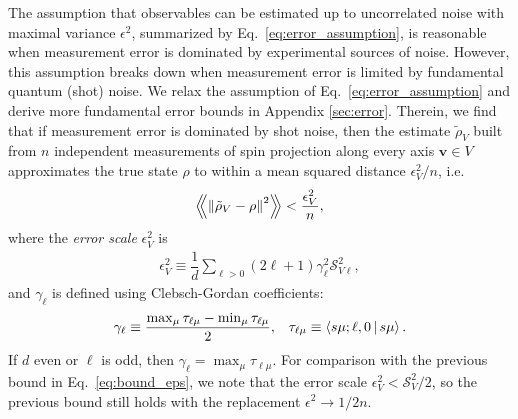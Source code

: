 \documentclass[notitlepage,twocolumn]{revtex4-2}
\newcommand{\f}[2]{\dfrac{#1}{#2}} %
\newcommand{\p}[1]{\left(#1\right)} %
\newcommand{\bk}{\Braket} %
\renewcommand{\v}{\bm} %
\newcommand{\Bbk}[1]
{\left\langle\!\!\left\langle #1 \right\rangle\!\!\right\rangle}
\renewcommand{\S}{\mathcal{S}}
\begin{document}
The assumption that observables can be estimated up to uncorrelated noise with maximal variance $\epsilon^2$, summarized by Eq.~\eqref{eq:error_assumption}, is reasonable when measurement error is dominated by experimental sources of noise.
However, this assumption breaks down when measurement error is limited by fundamental quantum (shot) noise.
We relax the assumption of Eq.~\eqref{eq:error_assumption} and derive more fundamental error bounds in Appendix \ref{sec:error}.
Therein, we find that if measurement error is dominated by shot noise, then the estimate $\tilde\rho_V$ built from $n$ independent measurements of spin projection along every axis $\v v\in V$ approximates the true state $\rho$ to within a mean squared distance $\epsilon_V^2/n$, i.e.
\begin{align}
  \Bbk{\norm{\tilde\rho_V-\rho}^2} < \f{\epsilon_V^2}{n},
  \label{eq:bound}
\end{align}
where the {\it error scale} $\epsilon_V^2$ is
\begin{align}
  \epsilon_V^2 \equiv
  \f1d \sum_{\ell>0} \p{2\ell+1} \gamma_\ell^2 \S_{V\ell}^2,
  \label{eq:scale}
\end{align}
and $\gamma_\ell$ is defined using Clebsch-Gordan coefficients:
\begin{align}
  \gamma_\ell
  \equiv \f{\max_\mu\tau_{\ell\mu} - \min_\mu\tau_{\ell\mu}}{2},
  &&
  \tau_{\ell\mu} \equiv \bk{s\mu;\ell,0|s\mu}.
\end{align}
If $d$ even or $\ell$ is odd, then $\gamma_\ell=\max_\mu\tau_{\ell\mu}$.
For comparison with the previous bound in Eq.~\eqref{eq:bound_eps}, we note that the error scale $\epsilon_V^2<\S_V^2/2$, so the previous bound still holds with the replacement $\epsilon^2\to1/2n$.
\end{document}
